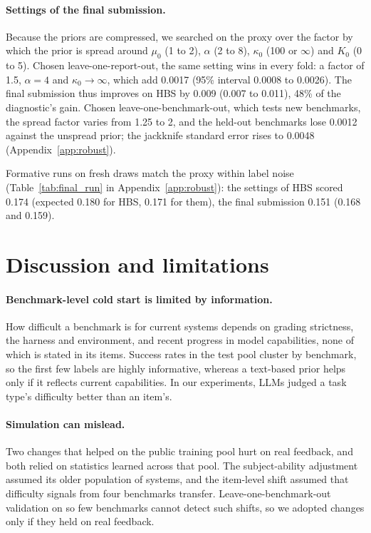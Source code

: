 \documentclass{article}
\begin{document}
\paragraph{Settings of the final submission.} Because the priors are compressed, we searched on the proxy over the factor by which the prior is spread around $\mu_0$ (1 to 2), $\alpha$ (2 to 8), $\kappa_0$ (100 or $\infty$) and $K_0$ (0 to 5). Chosen leave-one-report-out, the same setting wins in every fold: a factor of 1.5, $\alpha = 4$ and $\kappa_0 \to \infty$, which add 0.0017 (95\% interval 0.0008 to 0.0026). The final submission thus improves on HBS by 0.009 (0.007 to 0.011), 48\% of the diagnostic's gain. Chosen leave-one-benchmark-out, which tests new benchmarks, the spread factor varies from 1.25 to 2, and the held-out benchmarks lose 0.0012 against the unspread prior; the jackknife standard error rises to 0.0048 (Appendix~\ref{app:robust}).

Formative runs on fresh draws match the proxy within label noise (Table~\ref{tab:final_run} in Appendix~\ref{app:robust}): the settings of HBS scored 0.174 (expected 0.180 for HBS, 0.171 for them), the final submission 0.151 (0.168 and 0.159).

\section{Discussion and limitations}
\label{sec:discussion}

\paragraph{Benchmark-level cold start is limited by information.} How difficult a benchmark is for current systems depends on grading strictness, the harness and environment, and recent progress in model capabilities, none of which is stated in its items. Success rates in the test pool cluster by benchmark, so the first few labels are highly informative, whereas a text-based prior helps only if it reflects current capabilities. In our experiments, LLMs judged a task type's difficulty better than an item's.

\paragraph{Simulation can mislead.} Two changes that helped on the public training pool hurt on real feedback, and both relied on statistics learned across that pool. The subject-ability adjustment assumed its older population of systems, and the item-level shift assumed that difficulty signals from four benchmarks transfer. Leave-one-benchmark-out validation on so few benchmarks cannot detect such shifts, so we adopted changes only if they held on real feedback.
\end{document}
